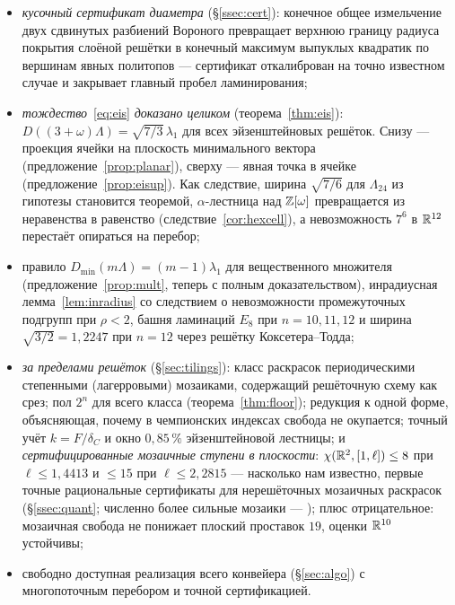 \begin{itemize}[leftmargin=1.4em,itemsep=1pt]
классических родителях пол \emph{совпадает с рекордом}: $2401$ неулучшаемо на
$E_8$ (теорема~\ref{thm:e8opt}) и $15$ неулучшаемо на ОЦК
(теорема~\ref{thm:a3opt}); для $E_6^*$, $K_{12}$ и решётки Лича полы подняты
соответственно с $176$ до $305$, с $111\,019$ до $177\,979$ и впервые
посчитаны ($5\,688\,009\,064$ при рекорде $7^{12}$);
\item \emph{кусочный сертификат диаметра} (\S\ref{ssec:cert}): конечное общее
измельчение двух сдвинутых разбиений Вороного превращает верхнюю границу
радиуса покрытия слоёной решётки в конечный максимум выпуклых квадратик по
вершинам явных политопов --- сертификат откалиброван на точно известном
случае и закрывает главный пробел ламинирования;
\item \emph{тождество}~\eqref{eq:eis} \emph{доказано целиком}
(теорема~\ref{thm:eis}): $D((3+\omega)\Lambda)=\sqrt{7/3}\,\lambda_1$ для всех
эйзенштейновых решёток. Снизу --- проекция ячейки на плоскость минимального
вектора (предложение~\ref{prop:planar}), сверху --- явная точка в ячейке
(предложение~\ref{prop:eisup}). Как следствие,
ширина $\sqrt{7/6}$ для $\Lambda_{24}$ из гипотезы становится теоремой,
$\alpha$-лестница над $\mathbb{Z}[\omega]$ превращается из неравенства в равенство
(следствие~\ref{cor:hexcell}), а невозможность $7^6$ в $\mathbb{R}^{12}$ перестаёт
опираться на перебор;
\item правило $D_{\min}(m\Lambda)=(m-1)\lambda_1$ для вещественного множителя
(предложение~\ref{prop:mult}, теперь с полным доказательством), инрадиусная
лемма~\ref{lem:inradius} со следствием о невозможности промежуточных подгрупп
при $\rho<2$, башня ламинаций $E_8$ при $n=10,11,12$ и ширина
$\sqrt{3/2}=1{,}2247$ при $n=12$ через решётку Коксетера--Тодда;
\item \emph{за пределами решёток} (\S\ref{sec:tilings}): класс раскрасок
периодическими степенными (лагерровыми) мозаиками, содержащий решёточную
схему как срез; пол $2^n$ для всего класса (теорема~\ref{thm:floor});
редукция к одной форме, объясняющая, почему в чемпионских индексах свобода
не окупается; точный учёт $k=F/\delta_C$ и окно $0{,}85\,\%$ эйзенштейновой
лестницы; и \emph{сертифицированные мозаичные ступени в плоскости}:
$\chi(\mathbb{R}^2,[1,\ell])\le8$ при $\ell\le1{,}4413$ и $\le15$ при
$\ell\le2{,}2815$ --- насколько нам известно, первые точные рациональные
сертификаты для нерешёточных мозаичных раскрасок (\S\ref{ssec:quant};
численно более сильные мозаики --- \cite{deGreyParts,Parts2023}); плюс
отрицательное: мозаичная свобода не понижает плоский проставок $19$, оценки
$\mathbb{R}^{10}$ устойчивы;
\item свободно доступная реализация всего конвейера (\S\ref{sec:algo}) с
многопоточным перебором и точной сертификацией.
\end{itemize}

